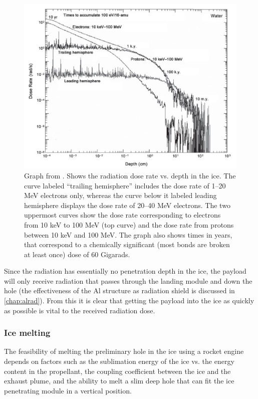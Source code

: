 \begin{figure}
\begin{center}
\includegraphics[scale=0.5]{figures/navtheory/icerad}
\caption{Graph from \cite{Paranicas_2009}. Shows the radiation dose rate vs. depth in the ice. The curve labeled “trailing hemisphere” includes the dose rate of 1–20 MeV electrons only, whereas the curve below it labeled leading hemisphere displays the dose rate of 20–40 MeV electrons. The two uppermost curves show the dose rate corresponding to electrons from 10 keV to 100 MeV (top curve) and the dose rate from protons between 10 keV and 100 MeV. The graph also shows times in years, that correspond to a chemically significant (most bonds
are broken at least once) dose of 60 Gigarads.}
\label{icerad}
\end{center}
\end{figure}

Since the radiation has essentially no penetration depth in the ice, the payload will only receive radiation that passes through the landing module and down the hole (the effectiveness of the Al structure as radiation shield is discussed in \ref{chap:alrad}). From this it is clear that getting the payload into the ice as quickly as possible is vital to the received radiation dose. 


\subsubsection{Ice melting}

The feasibility of melting the preliminary hole in the ice using a rocket engine depends on factors such as the sublimation energy of the ice vs. the energy content in the propellant, the coupling coefficient between the ice and the exhaust plume, and the ability to melt a slim deep hole that can fit the ice penetrating module in a vertical position. 

